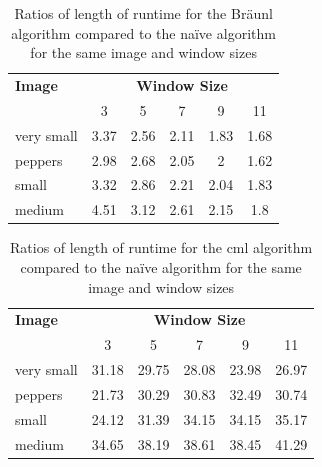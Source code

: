 \begin{table}
\centering
\caption[Ratios runtime for the Bräunl algorithm vs the naïve algorithm]{Ratios of length of runtime for the Bräunl algorithm compared to the naïve algorithm for the same image and window sizes}
\label{tab:median:ratbraun}
\begin{tabular}{@{}lccccc@{}}
\toprule
\textbf{Image} & \multicolumn{5}{c}{\textbf{Window Size}} \\
               & 3      & 5      & 7      & 9     & 11    \\ \midrule
very small     & 3.37   & 2.56   & 2.11   & 1.83  & 1.68  \\
peppers        & 2.98   & 2.68   & 2.05   & 2     & 1.62  \\
small          & 3.32   & 2.86   & 2.21   & 2.04  & 1.83  \\
medium         & 4.51   & 3.12   & 2.61   & 2.15  & 1.8   \\ \bottomrule
\end{tabular}
\end{table}

\begin{table}
\centering
\caption[Ratios of runtime for the  algorithm compared to the naïve algorithm]{Ratios of length of runtime for the \gls{cml} algorithm compared to the naïve algorithm for the same image and window sizes}
\label{tab:median:ratcml}
\begin{tabular}{@{}lccccc@{}}
\toprule
\textbf{Image} & \multicolumn{5}{c}{\textbf{Window Size}} \\
               & 3      & 5      & 7      & 9     & 11    \\ \midrule
very small     & 31.18  & 29.75  & 28.08  & 23.98 & 26.97 \\
peppers        & 21.73  & 30.29  & 30.83  & 32.49 & 30.74 \\
small          & 24.12  & 31.39  & 34.15  & 34.15 & 35.17 \\
medium         & 34.65  & 38.19  & 38.61  & 38.45 & 41.29 \\ \bottomrule
\end{tabular}
\end{table}

